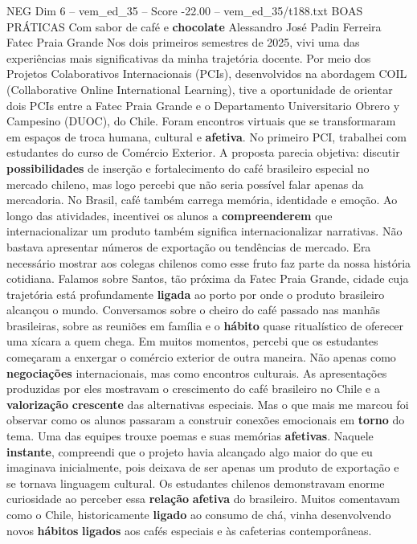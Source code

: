 \begin{textsample}{NEG Dim 6 – vem\_ed\_35 – Score -22.00 – vem\_ed\_35/t188.txt}  \label{ex:f6_neg_007}
BOAS PRÁTICAS Com sabor de café e \textbf{chocolate} Alessandro José Padin Ferreira Fatec Praia Grande Nos dois primeiros semestres de 2025, vivi uma das experiências mais significativas da minha trajetória docente.
Por meio dos Projetos Colaborativos Internacionais (PCIs), desenvolvidos na abordagem COIL (Collaborative Online International Learning), tive a oportunidade de orientar dois PCIs entre a Fatec Praia Grande e o Departamento Universitario Obrero y Campesino (DUOC), do Chile.
Foram encontros virtuais que se transformaram em espaços de troca humana, cultural e \textbf{afetiva}.
No primeiro PCI, trabalhei com estudantes do curso de Comércio Exterior.
A proposta parecia objetiva: discutir \textbf{possibilidades} de inserção e fortalecimento do café brasileiro especial no mercado chileno, mas logo percebi que não seria possível falar apenas da mercadoria.
No Brasil, café também carrega memória, identidade e emoção.
Ao longo das atividades, incentivei os alunos a \textbf{compreenderem} que internacionalizar um produto também significa internacionalizar narrativas.
Não bastava apresentar números de exportação ou tendências de mercado.
Era necessário mostrar aos colegas chilenos como esse fruto faz parte da nossa história cotidiana.
Falamos sobre Santos, tão próxima da Fatec Praia Grande, cidade cuja trajetória está profundamente \textbf{ligada} ao porto por onde o produto brasileiro alcançou o mundo.
Conversamos sobre o cheiro do café passado nas manhãs brasileiras, sobre as reuniões em família e o \textbf{hábito} quase ritualístico de oferecer uma xícara a quem chega.
Em muitos momentos, percebi que os estudantes começaram a enxergar o comércio exterior de outra maneira.
Não apenas como \textbf{negociações} internacionais, mas como encontros culturais.
As apresentações produzidas por eles mostravam o crescimento do café brasileiro no Chile e a \textbf{valorização} \textbf{crescente} das alternativas especiais.
Mas o que mais me marcou foi observar como os alunos passaram a construir conexões emocionais em \textbf{torno} do tema.
Uma das equipes trouxe poemas e suas memórias \textbf{afetivas}.
Naquele \textbf{instante}, compreendi que o projeto havia alcançado algo maior do que eu imaginava inicialmente, pois deixava de ser apenas um produto de exportação e se tornava linguagem cultural.
Os estudantes chilenos demonstravam enorme curiosidade ao perceber essa \textbf{relação} \textbf{afetiva} do brasileiro.
Muitos comentavam como o Chile, historicamente \textbf{ligado} ao consumo de chá, vinha desenvolvendo novos \textbf{hábitos} \textbf{ligados} aos cafés especiais e às cafeterias contemporâneas.

\end{textsample}
